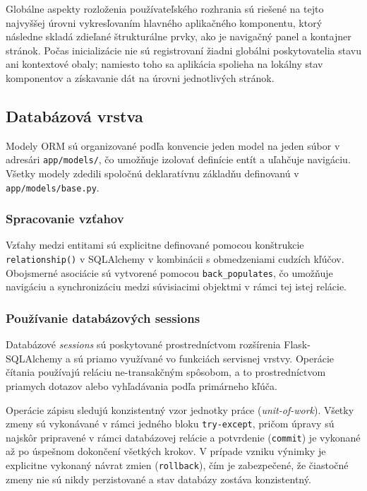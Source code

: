Globálne aspekty rozloženia používateľského rozhrania sú riešené na tejto najvyššej úrovni vykresľovaním hlavného aplikačného komponentu, ktorý následne skladá zdieľané štrukturálne prvky, ako je navigačný panel a kontajner stránok. Počas inicializácie nie sú registrovaní žiadni globálni poskytovatelia stavu ani kontextové obaly; namiesto toho sa aplikácia spolieha na lokálny stav komponentov a získavanie dát na úrovni jednotlivých stránok.

\subsection{Databázová vrstva}

Modely ORM sú organizované podľa konvencie jeden model na jeden súbor v adresári \texttt{app/models/}, čo umožňuje izolovať definície entít a uľahčuje navigáciu. Všetky modely zdedili spoločnú deklaratívnu základňu definovanú v \texttt{app/models/base.py}. 

\subsubsection{Spracovanie vzťahov}

Vzťahy medzi entitami sú explicitne definované pomocou konštrukcie \texttt{relationship()} v SQLAlchemy v kombinácii s obmedzeniami cudzích kľúčov. Obojsmerné asociácie sú vytvorené pomocou \texttt{back\_populates}, čo umožňuje navigáciu a synchronizáciu medzi súvisiacimi objektmi v rámci tej istej relácie.


\subsubsection{Používanie databázových sessions}

Databázové \textit{sessions} sú poskytované prostredníctvom rozšírenia Flask-SQLAlchemy a sú priamo využívané vo funkciách servisnej vrstvy. Operácie čítania používajú reláciu ne-transakčným spôsobom, a to prostredníctvom priamych dotazov alebo vyhľadávania podľa primárneho kľúča.

Operácie zápisu sledujú konzistentný vzor jednotky práce (\textit{unit-of-work}). Všetky zmeny sú vykonávané v rámci jedného bloku \texttt{try-except}, pričom úpravy sú najskôr pripravené v rámci databázovej relácie a potvrdenie (\texttt{commit}) je vykonané až po úspešnom dokončení všetkých krokov. V prípade vzniku výnimky je explicitne vykonaný návrat zmien (\texttt{rollback}), čím je zabezpečené, že čiastočné zmeny nie sú nikdy perzistované a stav databázy zostáva konzistentný.


